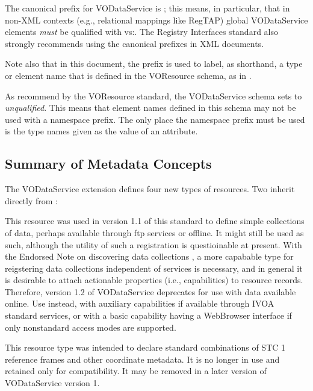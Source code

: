 \documentclass[11pt,a4paper]{ivoa}
\begin{document}
The canonical prefix for VODataService is ; this means, in
particular, that in non-XML contexts (e.g., relational mappings
like RegTAP) global VODataService elements \emph{must} be qualified with
vs:.  The Registry Interfaces standard \citep{2018ivoa.spec.0723D} also
strongly recommends using the canonical prefixes in XML documents.

Note also that in this document, the  prefix is used to
label, as shorthand, a type or element name that is defined in the
VOResource schema, as in .




As recommend by the VOResource standard, the
VODataService schema sets  to \emph{unqualified}.
This means that element names defined
in this schema may not be used with a namespace prefix.
The only place the namespace prefix must be used is the
type names given as the value of an
 attribute.  


\subsection{Summary of Metadata Concepts}
\label{sect:summ}


The VODataService extension defines four new types of resources.  Two inherit
directly from :


\begin{bigdescription}
\item[\xmlel{vs:DataCollection}]
This resource was used in version 1.1 of this standard to define simple
collections of data, perhaps available through ftp services or offline.
It might still be used as such, although the utility of such a
registration is questioinable at present.  With the Endorsed Note on
discovering data collections \citep{todo:DDC}, a more capabable type for
reigstering data collections independent of services is necessary, and
in general it is desirable to attach actionable properties (i.e.,
capabilities) to resource records.  Therefore, version 1.2 of
VODataService deprecates  for use with data
available online.  Use  instead, with auxiliary
capabilities if available through IVOA standard services, or with a
basic capability having a WebBrowser interface if only nonstandard
access modes are supported.
       

\item[\xmlel{vs:StandardSTC}]
This resource type was intended to declare standard combinations of
STC 1 reference frames and other coordinate metadata.  It is no longer
in use and retained only for compatibility.  It may be removed in a
later version of VODataService version 1.
\end{bigdescription}
\end{document}
